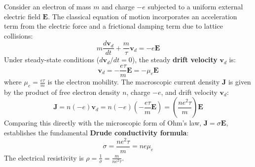 \begin{derivationbox}
Consider an electron of mass $m$ and charge $-e$ subjected to a uniform external electric field $\mathbf{E}$. The classical equation of motion incorporates an acceleration term from the electric force and a frictional damping term due to lattice collisions:
\begin{equation}
    m \frac{d\mathbf{v}_d}{dt} + \frac{m}{\tau}\mathbf{v}_d = -e \mathbf{E}
\end{equation}
Under steady-state conditions ($d\mathbf{v}_d/dt = 0$), the steady \textbf{drift velocity} $\mathbf{v}_d$ is:
\begin{equation}
    \mathbf{v}_d = -\frac{e \tau}{m} \mathbf{E} = -\mu_e \mathbf{E}
\end{equation}
where $\mu_e = \frac{e\tau}{m}$ is the electron mobility. The macroscopic current density $\mathbf{J}$ is given by the product of free electron density $n$, charge $-e$, and drift velocity $\mathbf{v}_d$:
\begin{equation}
    \mathbf{J} = n(-e)\mathbf{v}_d = n(-e)\left(-\frac{e\tau}{m}\mathbf{E}\right) = \left(\frac{n e^2 \tau}{m}\right)\mathbf{E}
\end{equation}
Comparing this directly with the microscopic form of Ohm's law, $\mathbf{J} = \sigma \mathbf{E}$, establishes the fundamental \textbf{Drude conductivity formula}:
\begin{equation}
    \sigma = \frac{n e^2 \tau}{m} = n e \mu_e
\end{equation}
The electrical resistivity is $\rho = \frac{1}{\sigma} = \frac{m}{n e^2 \tau}$.
\end{derivationbox}

